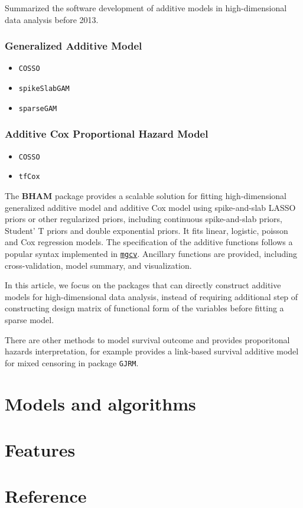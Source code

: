 \documentclass[
]{jss}
\begin{document}
\cite{Scheipl2013} Summarized the software development of additive
models in high-dimensional data analysis before 2013.

\subsubsection{Generalized Additive Model}
\begin{itemize}
\item \texttt{COSSO}
\item \texttt{spikeSlabGAM}
\item \texttt{sparseGAM}
\end{itemize}

\subsubsection{Additive Cox Proportional Hazard Model}
\begin{itemize}
\item \texttt{COSSO}
\item \texttt{tfCox}
\end{itemize}

The \textbf{BHAM} package provides a scalable solution for fitting
high-dimensional generalized additive model and additive Cox model using
spike-and-slab LASSO priors or other regularized priors, including
continuous spike-and-slab priors, Student' T priors and double
exponential priors. It fits linear, logistic, poisson and Cox regression
models. The specification of the additive functions follows a popular
syntax implemented in
\href{https://cran.r-project.org/web/packages/mgcv/index.html}{\texttt{mgcv}}.
Ancillary functions are provided, including cross-validation, model
summary, and visualization.

In this article, we focus on the packages that can directly construct
additive models for high-dimensional data analysis, instead of requiring
additional step of constructing design matrix of functional form of the
variables before fitting a sparse model.

There are other methods to model survival outcome and provides
proporitonal hazards interpretation, for example \cite{Marra2021}
provides a link-based survival additive model for mixed censoring in
package \texttt{GJRM}.

\section{Models and algorithms}

\section{Features}

\clearpage
\section{Reference}
\end{document}
